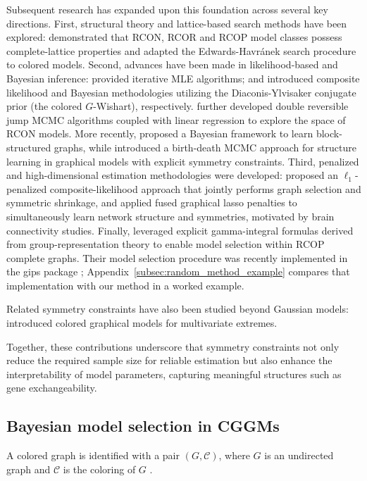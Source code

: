 \documentclass[12pt]{amsart}
\theoremstyle{plain}
\theoremstyle{definition}
\theoremstyle{remark}
\newcommand{\1}{\mathbf{1}}
\begin{document}
Subsequent research has expanded upon this foundation across several key directions. First, structural theory and lattice-based search methods have been explored: \citet{Ge11} demonstrated that RCON, RCOR and RCOP model classes possess complete-lattice properties and adapted the Edwards-Havránek search procedure to colored models.
Second, advances have been made in likelihood-based and Bayesian inference: \citet{HL07} provided iterative MLE algorithms; \citet{GM15} and \citet{MLG15} introduced composite likelihood and Bayesian methodologies utilizing the Diaconis-Ylvisaker conjugate prior (the colored $G$-Wishart), respectively. \citet{LiGM20} further developed double reversible jump MCMC algorithms coupled with linear regression to explore the space of RCON models. More recently, \citet{CAPP24} proposed a Bayesian framework to learn block-structured graphs, while \citet{Biom25} introduced a birth-death MCMC approach for structure learning in graphical models with explicit symmetry constraints. Third, penalized and high-dimensional estimation methodologies were developed: \citet{QXNX21} proposed an $\ell_1$-penalized composite-likelihood approach that jointly performs graph selection and symmetric shrinkage, and \citet{RRL21} applied fused graphical lasso penalties to simultaneously learn network structure and symmetries, motivated by brain connectivity studies. Finally, \citet{GIKM22} leveraged explicit gamma-integral formulas derived from group-representation theory to enable model selection within RCOP complete graphs. Their model selection procedure was recently implemented in the \textsf{gips} package \citep{gips}; Appendix~\ref{subsec:random_method_example} compares that implementation with our method in a worked example.

Related symmetry constraints have also been studied beyond Gaussian models:
\citet{RCG26} introduced colored graphical models for multivariate extremes.

Together, these contributions underscore that symmetry constraints not only reduce the required sample size for reliable estimation but also enhance the interpretability of model parameters, capturing meaningful structures such as gene exchangeability.


\subsection{Bayesian model selection in CGGMs}\label{sec:bayesian-model-selection}
A colored graph is identified with a pair $(G,\mathcal{C})$, where $G$ is an undirected graph and $\mathcal{C}$ is the coloring of $G$ \citep{HL08}.
\end{document}
